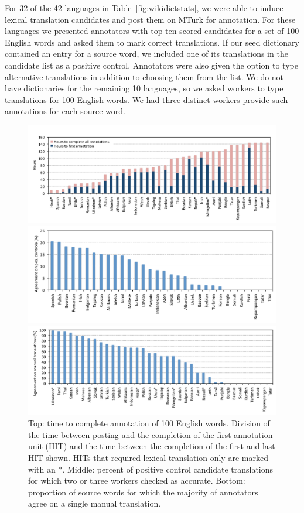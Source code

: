 \documentclass{article}
\newcommand{\tabref}[1]{Table~\ref{#1}}
\begin{document}
For 32 of the 42 languages in \tabref{fig:wikidictstats}, we were able to induce lexical translation candidates and post them on MTurk for annotation. For these languages we presented annotators with top ten scored candidates for a set of 100 English words and asked them to mark correct translations. If our seed dictionary contained an entry for a source word, we included one of its translations in the candidate list as a positive control. %
Annotators were also given the option to type alternative translations in addition to choosing them from the list.
We do not have dictionaries for the remaining 10 languages, so we asked workers to type translations for 100 English words. We had three distinct workers provide such annotations for each source word. \\ 

\begin{figure}[h!]
\centerline{\mbox{\includegraphics[width=5in]{figures/exp4/time}}}
\centerline{\mbox{\includegraphics[width=5in]{figures/exp4/controls}}}
\centerline{\mbox{\includegraphics[width=5in]{figures/exp4/manual}}}
\caption{Top: time to complete annotation of 100 English words.  Division of the time between posting and the completion of the first annotation unit (HIT) and the time between the completion of the first and last HIT shown. HITs that required lexical translation only are marked with an $*$. Middle: percent of positive control candidate translations for which two or three workers checked as accurate. Bottom: proportion of source words for which the majority of annotators agree on a single manual translation.}
\label{fig:exp4}
\end{figure}
\end{document}
